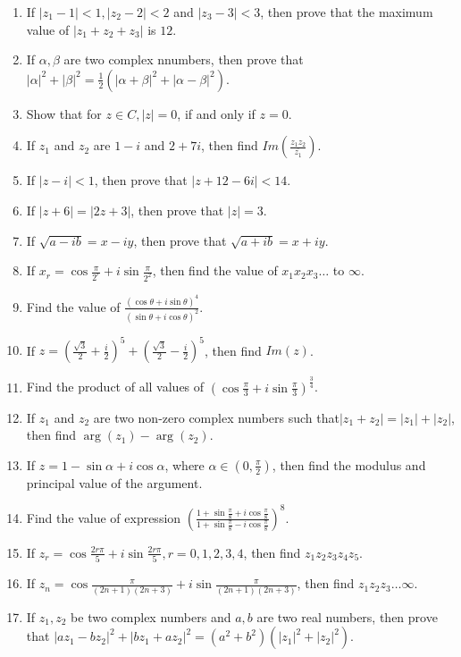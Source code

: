 \begin{enumerate}[resume]
\item If $|z_1 - 1|< 1, |z_2 - 2| < 2$ and $|z_3 - 3|< 3$, then prove that the maximum value of $|z_1 + z_2 + z_3|$ is $12$.
\item If $\alpha, \beta$ are two complex nnumbers, then prove that $|\alpha|^2 + |\beta|^2 = \frac{1}{2}(|\alpha + \beta|^2 +
  |\alpha - \beta|^2)$.
\item Show that for $z\in C, |z| = 0$, if and only if $z = 0$.
\item If $z_1$ and $z_2$ are $1 - i$ and $2 + 7i$, then find $Im\left(\frac{z_1z_2}{\overline{z_1}}\right)$.
\item If $|z - i|< 1$, then prove that $|z + 12 - 6i| < 14$.
\item If $|z + 6| = |2z + 3|$, then prove that $|z| = 3$.
\item If $\sqrt{a - ib} = x -iy$, then prove that $\sqrt{a + ib} = x + iy$.
\item If $x_r = \cos\frac{\pi}{2^r} + i\sin\frac{\pi}{2^2}$, then find the value of $x_1x_2x_3\ldots$ to $\infty$.
\item Find the value of $\frac{(\cos\theta + i\sin\theta)^4}{(\sin\theta + i\cos\theta)^2}$.
\item If $z = \left(\frac{\sqrt{3}}{2} + \frac{i}{2}\right)^5 + \left(\frac{\sqrt{3}}{2} - \frac{i}{2}\right)^5$, then find
  $Im(z)$.
\item Find the product of all values of $\left(\cos\frac{\pi}{3} + i\sin\frac{\pi}{3}\right)^{\frac{3}{4}}$.
\item If $z_1$ and $z_2$ are two non-zero complex numbers such that$|z_1 + z_2| = |z_1| + |z_2|$, then find $\arg(z_1) - \arg(z_2)$.
\item If $z = 1 - \sin\alpha + i\cos\alpha$, where $\alpha \in \left(0, \frac{\pi}{2}\right)$, then find the modulus and principal
  value of the argument.
\item Find the value of expression $\left(\frac{1 + \sin\frac{\pi}{8} + i\cos\frac{\pi}{8}}{1 + \sin\frac{\pi}{8} -
  i\cos\frac{\pi}{8}}\right)^8$.
\item If $z_r = \cos\frac{2r\pi}{5} + i\sin\frac{2r\pi}{5}, r = 0, 1, 2, 3, 4$, then find $z_1z_2z_3z_4z_5$.
\item If $z_n = \cos\frac{\pi}{(2n + 1)(2n + 3)} + i\sin\frac{\pi}{(2n + 1)(2n + 3)}$, then find $z_1z_2z_3\ldots\infty$.
\item If $z_1, z_2$ be two complex numbers and $a, b$ are two real numbers, then prove that $|az_1 - bz_2|^2 + |bz_1 + az_2|^2 =
  (a^2 + b^2)(|z_1|^2 + |z_2|^2)$.

\end{enumerate}
